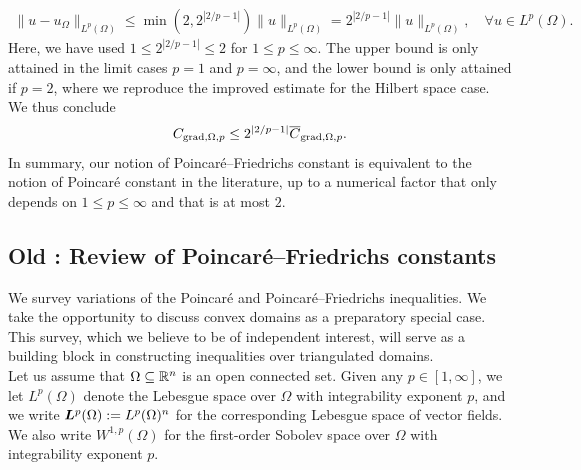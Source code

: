 \documentclass[10pt,a4paper]{article}
\begin{document}
\begin{align*}
    \| u - u_\Omega \|_{L^{p}(\Omega)}
    \leq 
    \min\left( 2, 2^{|2/p-1|} \right)
    \| u \|_{L^{p}(\Omega)}
    = 
    2^{|2/p-1|} 
    \| u \|_{L^{p}(\Omega)}
    ,
    \quad 
    \forall 
    u \in L^{p}(\Omega)
    .
\end{align*}
Here, we have used $1 \leq 2^{|2/p-1|} \leq 2$ for $1 \leq p \leq \infty$.
The upper bound is only attained in the limit cases $p = 1$ and $p = \infty$, and the lower bound is only attained if $p = 2$, where we reproduce the improved estimate for the Hilbert space case.
We thus conclude 
\begin{align}\label{math:p_vs_pf}
    C_{\operatorname{grad},\Omega,p} \leq 2^{|2/p-1|} \overline C_{\operatorname{grad},\Omega,p}.
\end{align}
In summary, our notion of Poincar\'e--Friedrichs constant is equivalent to the notion of Poincar\'e constant in the literature, up to a numerical factor that only depends on $1 \leq p \leq \infty$ and that is at most $2$.




\subsection{Old : Review of Poincar\'e--Friedrichs constants}\label{section:poincare}

We survey variations of the Poincar\'e and Poincar\'e--Friedrichs inequalities. 
We take the opportunity to discuss convex domains as a preparatory special case.
This survey, which we believe to be of independent interest, will serve as a building block in constructing inequalities over triangulated domains.
\\

Let us assume that $\Omega \subseteq {\mathbb R}^{n}$ is an open connected set. 
Given any $p \in [1,\infty]$, we let $L^{p}(\Omega)$ denote the Lebesgue space over $\Omega$ with integrability exponent $p$, and we write $\bm{L}^{p}(\Omega) := L^{p}(\Omega)^{n}$ for the corresponding Lebesgue space of vector fields. 
We also write $W^{1,p}(\Omega)$ for the first-order Sobolev space over $\Omega$ with integrability exponent $p$. 

\end{document}
